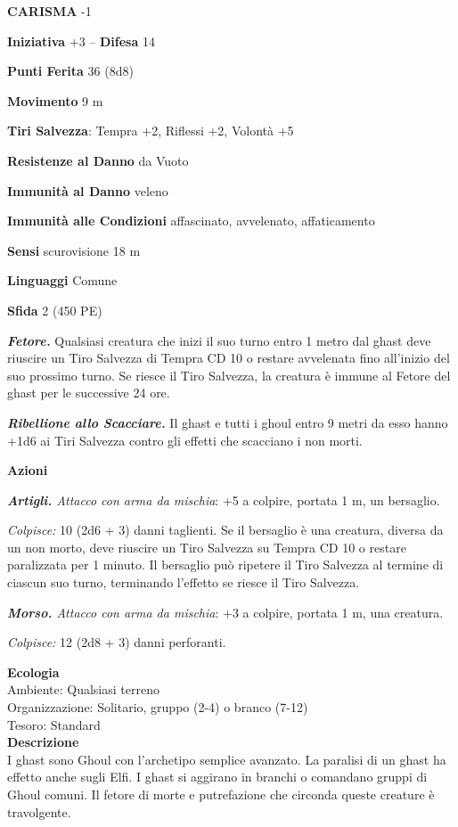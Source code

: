 \begin{multicols}{2}
\textbf{CARISMA} -1

\textbf{Iniziativa} +3 -- \textbf{Difesa} 14

\textbf{Punti Ferita} 36 (8d8)

\textbf{Movimento} 9 m

\textbf{Tiri Salvezza}: Tempra +2, Riflessi +2, Volontà +5

\textbf{Resistenze al Danno} da Vuoto

\textbf{Immunità al Danno} veleno

\textbf{Immunità alle Condizioni} affascinato, avvelenato, affaticamento

\textbf{Sensi} scurovisione 18 m

\textbf{Linguaggi} Comune

\textbf{Sfida} 2 (450 PE)

\emph{\textbf{Fetore.}} Qualsiasi creatura che inizi il suo turno entro 1 metro dal ghast deve riuscire un Tiro Salvezza di Tempra CD 10 o restare avvelenata fino all'inizio del suo prossimo turno. Se riesce il Tiro Salvezza, la creatura è immune al Fetore del ghast per le successive 24
ore.

\emph{\textbf{Ribellione allo Scacciare.}} Il ghast e tutti i ghoul entro 9 metri da esso hanno +1d6 ai Tiri Salvezza contro gli effetti che scacciano i non morti.

\textbf{Azioni}

\emph{\textbf{Artigli.} Attacco con arma da mischia}: +5 a colpire, portata 1 m, un bersaglio.

\emph{Colpisce:} 10 (2d6 + 3) danni taglienti. Se il bersaglio è una creatura, diversa da un non morto, deve riuscire un Tiro Salvezza su Tempra CD 10 o restare paralizzata per 1 minuto. Il bersaglio può ripetere il Tiro Salvezza al termine di ciascun suo turno, terminando l'effetto se riesce il Tiro Salvezza. 

\emph{\textbf{Morso.} Attacco con arma da mischia}: +3 a colpire, portata 1 m, una creatura.

\emph{Colpisce:} 12 (2d8 + 3) danni perforanti.

\textbf{Ecologia}\\
Ambiente: Qualsiasi terreno\\
Organizzazione: Solitario, gruppo (2-4) o branco (7-12)\\
Tesoro: Standard\\
\textbf{Descrizione}\\
I ghast sono Ghoul con l'archetipo semplice avanzato. La paralisi di un ghast ha effetto anche sugli Elfi. I ghast si aggirano in branchi o comandano gruppi di Ghoul comuni. Il fetore di morte e putrefazione che circonda queste creature è travolgente.\\



\end{multicols}
